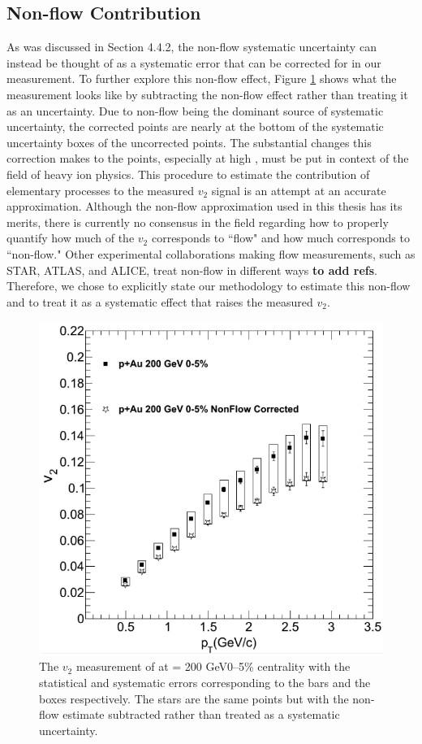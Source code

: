 \subsection{Non-flow Contribution}
\label{sec:ch5-non-flow}
As was discussed in Section 4.4.2, the non-flow systematic uncertainty can instead be thought of as a systematic error that can be corrected for in our measurement. To further explore this non-flow effect, Figure \ref{fig:pau_points_alone_nf} shows what the \pau measurement looks like by subtracting the  non-flow effect rather than treating it as an uncertainty. Due to non-flow being the dominant source of systematic uncertainty, the corrected \pau points are nearly at the bottom of the systematic uncertainty boxes of the uncorrected points.  The substantial changes this correction makes to the \pau points, especially at high \pt, must be put in context of the field of heavy ion physics. This procedure to estimate the contribution of elementary processes to the measured $v_2$ signal is an attempt at an accurate approximation. Although the non-flow approximation used in this thesis has its merits, there is currently no consensus in the field regarding how to properly quantify how much of the $v_2$ corresponds to ``flow" and how much corresponds to ``non-flow." Other experimental collaborations making flow measurements, such as STAR, ATLAS, and ALICE, treat non-flow in different ways \textbf{to add refs}. Therefore, we chose to explicitly state our methodology to estimate this non-flow and to treat it as a systematic effect that raises the measured $v_2$. %

\begin{figure}[!ht]
\begin{center}
\includegraphics[width=0.65\linewidth]{figs/figure_w_nonflow_corr.png}
\caption{The $v_2$ measurement of \pau at \sqsn =  200 GeV0--5\% centrality with the statistical and systematic errors corresponding to the bars and the boxes respectively. The stars are the same \pau points but with the non-flow estimate subtracted rather than treated as a systematic uncertainty.}
\label{fig:pau_points_alone_nf}
\end{center}
\end{figure}

